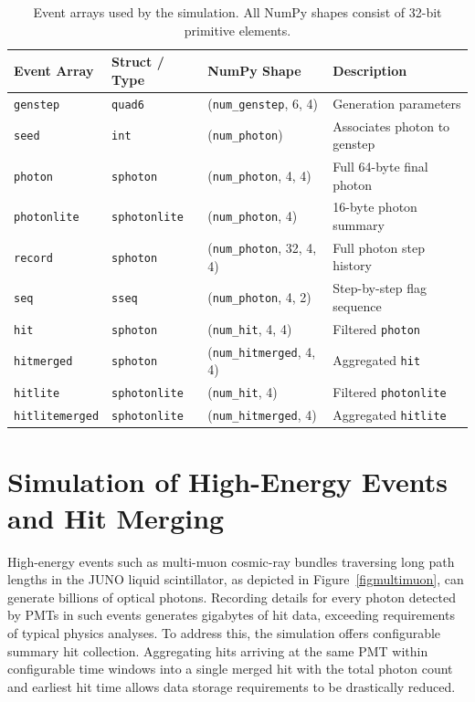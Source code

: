\documentclass{webofc}
\begin{document}
\begin{table}[htbp]
\centering
\begin{tabular}{ l l l p{4.2cm} }
  \hline
  Event Array            & Struct / Type         & NumPy Shape                      & Description \\
  \hline
  \texttt{genstep}       & \texttt{quad6}        & (\texttt{num\_genstep}, 6, 4)    & Generation parameters \\
  \texttt{seed}          & \texttt{int}          & (\texttt{num\_photon})           & Associates photon to genstep \\
  \hline
  \texttt{photon}        & \texttt{sphoton}      & (\texttt{num\_photon}, 4, 4)     & Full 64-byte final photon \\
  \texttt{photonlite}    & \texttt{sphotonlite}  & (\texttt{num\_photon}, 4)        & 16-byte photon summary \\
  \hline
  \texttt{record}        & \texttt{sphoton}      & (\texttt{num\_photon}, 32, 4, 4) & Full photon step history \\
  \texttt{seq}           & \texttt{sseq}         & (\texttt{num\_photon}, 4, 2)     & Step-by-step flag sequence \\
  \hline
  \texttt{hit}           & \texttt{sphoton}      & (\texttt{num\_hit}, 4, 4)        & Filtered \texttt{photon} \\
  \texttt{hitmerged}     & \texttt{sphoton}      & (\texttt{num\_hitmerged}, 4, 4)  & Aggregated \texttt{hit} \\
  \texttt{hitlite}       & \texttt{sphotonlite}  & (\texttt{num\_hit}, 4)           & Filtered \texttt{photonlite} \\
  \texttt{hitlitemerged} & \texttt{sphotonlite}  & (\texttt{num\_hitmerged}, 4)     & Aggregated \texttt{hitlite} \\
  \hline
\end{tabular}
\caption{Event arrays used by the simulation. All NumPy shapes consist of 32-bit primitive elements.}
\label{tabeventarrays}
\end{table}
%
%
\section{Simulation of High-Energy Events and Hit Merging}
%
High-energy events such as multi-muon cosmic-ray bundles traversing long path lengths in the JUNO
liquid scintillator, as depicted in Figure~\ref{figmultimuon}, can generate billions of optical photons.
Recording details for every photon detected by PMTs 
in such events generates gigabytes of hit data, exceeding requirements of typical physics analyses. 
To address this, the simulation offers configurable summary hit collection. 
Aggregating hits arriving at the same PMT within configurable time windows into a single merged hit
with the total photon count and earliest hit time allows data storage requirements to be drastically reduced.
\end{document}
